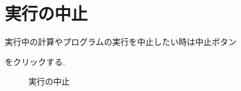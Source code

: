 \documentclass{jbook}
\begin{document}
\section{実行の中止}
%
%
  
実行中の計算やプログラムの実行を中止したい時は中止ボタン
\begin{center}
\end{center}
をクリックする.

\begin{figure}[tbh]
\begin{center}
\end{center}
\caption{実行の中止} \label{fig:interrupt}
\end{figure}
\end{document}
